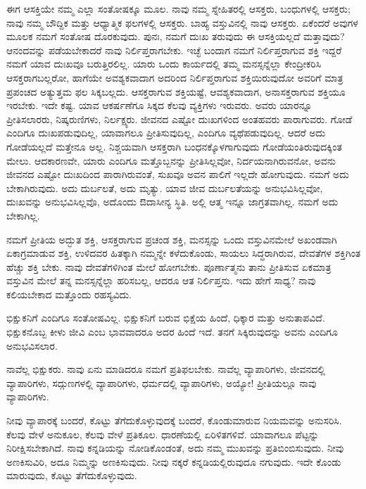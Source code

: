 ಈಗ ಆಸಕ್ತಿಯೇ ನಮ್ಮ ಎಲ್ಲಾ ಸಂತೋಷಕ್ಕೂ ಮೂಲ. ನಾವು ನಮ್ಮ ಸ್ನೇಹಿತರಲ್ಲಿ ಆಸಕ್ತರು, ಬಂಧುಗಳಲ್ಲಿ ಆಸಕ್ತರು; ನಾವು ನಮ್ಮ ಬೌದ್ದಿಕ ಮತ್ತು ಆಧ್ಯಾತ್ಮಿಕ ಫಲಗಳಲ್ಲಿ ಆಸಕ್ತರು. ಬಾಹ್ಯ ವಸ್ತುವಿನಲ್ಲಿ ನಾವು ಆಸಕ್ತರು. ಏಕೆಂದರೆ ಅವುಗಳ ಮೂಲಕ ನಮಗೆ ಸಂತೋಷ ದೊರಕುವುದು. ಪುನಃ, ನಮಗೆ ದುಃಖ ತರುವುದು ಈ ಆಸಕ್ತಿಯಲ್ಲದೆ ಮತ್ತಾವುದು? ಆನಂದವನ್ನು ಪಡೆಯಬೇಕಾದರೆ ನಾವು ನಿರ್ಲಿಪ್ತರಾಗಬೇಕು. ಇಚ್ಛೆ ಬಂದಾಗ ನಮಗೆ ನಿರ್ಲಿಪ್ತರಾಗುವ ಶಕ್ತಿ ಇದ್ದರೆ ನಮಗೆ ಯಾವ ದುಃಖವೂ ಬರುತ್ತಿರಲಿಲ್ಲ. ಯಾರು ಒಂದು ಕಾರ್ಯದಲ್ಲಿ ತಮ್ಮ ಮನಸ್ಸನ್ನೆಲ್ಲಾ ಕೇಂದ್ರೀಕರಿಸಿ ಆಸಕ್ತರಾಗಬಲ್ಲರೋ, ಹಾಗೆಯೇ ಅವಶ್ಯಕವಾದಾಗ ಅದರಿಂದ ನಿರ್ಲಿಪ್ತರಾಗುವ ಶಕ್ತಿಯಿರುವುದೋ ಅವರಿಗೆ ಮಾತ್ರ ಪ್ರಪಂಚದ ಅತ್ಯುತ್ತಮ ಫಲ ಸಿಕ್ಕಬಲ್ಲದು. ಆಸಕ್ತರಾಗುವ ಶಕ್ತಿಯಷ್ಟೆ, ಆವಶ್ಯಕವಾದಾಗ, ಅನಾಸಕ್ತರಾಗುವ ಶಕ್ತಿಯೂ ಇರಬೇಕು. ಇದೇ ಕಷ್ಟ. ಯಾವ ಆಕರ್ಷಣೆಗೂ ಸಿಕ್ಕದ ಕೆಲವು ವ್ಯಕ್ತಿಗಳು ಇರುವರು. ಅವರು ಯಾರನ್ನೂ ಪ್ರೀತಿಸಲಾರರು, ನಿಷ್ಕರುಣಿಗಳು, ನಿರ್ಲಕ್ಷ್ಯರು. ಜೀವನದ ಎಷ್ಟೋ ದುಃಖಗಳಿಂದ ಅಂತಹವರು ಪಾರಾಗುವರು. ಗೋಡೆ ಎಂದಿಗೂ ದುಃಖಪಡುವುದಿಲ್ಲ, ಯಾವಾಗಲೂ ಪ್ರೀತಿಸುವುದಿಲ್ಲ, ಎಂದಿಗೂ ವ್ಯಥೆಪಡುವುದಿಲ್ಲ. ಆದರೆ ಅದು ಗೋಡೆಯಲ್ಲದೆ ಮತ್ತೇನೂ ಅಲ್ಲ. ನಿಶ್ಚಯವಾಗಿ ಆಸಕ್ತರಾಗಿ ಬಂಧನಕ್ಕೊಳಗಾಗುವುದು ಗೋಡೆಯಂತಿರುವುದಕ್ಕಿಂತ ಮೇಲು. ಆದಕಾರಣವೇ, ಯಾರು ಎಂದಿಗೂ ಮತ್ತೊಬ್ಬನನ್ನು ಪ್ರೀತಿಸಿಲ್ಲವೋ, ನಿರ್ದಯನಾಗಿರುವನೋ, ಅವನು ಜೀವನದ ಎಷ್ಟೋ ದುಃಖದಿಂದ ಪಾರಾಗಿರುವಂತೆ, ಸುಖವೂ ಅವನ ಪಾಲಿಗೆ ಇಲ್ಲದೇ ಹೋಗುವುದು. ನಮಗೆ ಅದು ಬೇಕಾಗಿರುವುದು. ಅದು ದುರ್ಬಲತೆ, ಅದು ಮೃತ್ಯು. ಯಾವ ಜೀವ ದುರ್ಬಲತೆಯನ್ನು ಅನುಭವಿಸಿಲ್ಲವೋ, ದುಃಖವನ್ನು ಅನುಭವಿಸಿಲ್ಲವೊ, ಅದೊಂದು ಔದಾಸೀನ್ಯ ಸ್ಥಿತಿ. ಅಲ್ಲಿ ಆತ್ಮ ಇನ್ನೂ ಜಾಗ್ರತವಾಗಿಲ್ಲ. ನಮಗೆ ಅದು ಬೇಕಾಗಿಲ್ಲ.

ನಮಗೆ ಪ್ರೀತಿಯ ಅದ್ಭುತ ಶಕ್ತಿ, ಆಸಕ್ತರಾಗುವ ಪ್ರಚಂಡ ಶಕ್ತಿ, ಮನಸ್ಸನ್ನು ಒಂದು ವಸ್ತುವಿನಮೇಲೆ ಅಖಂಡವಾಗಿ ಏಕಾಗ್ರಮಾಡುವ ಶಕ್ತಿ, ಉಳಿದವರ ಹಿತಕ್ಕಾಗಿ ನಮ್ಮನ್ನೇ ಕಳೆದುಕೊಂಡು, ಸಾಯಲು ಸಿದ್ಧರಾಗಿರುವ, ದೇವತೆಗಳ ಶಕ್ತಿಗಿಂತ ಹೆಚ್ಚು ಶಕ್ತಿ ಬೇಕು. ನಾವು ದೇವತೆಗಳಿಗಿಂತ ಮೇಲೆ ಹೋಗಬೇಕು. ಪೂರ್ಣಾತ್ಮನು ತಾನು ಪ್ರೀತಿಸುವ ಏಕಮಾತ್ರ ವಸ್ತುವಿನ ಮೇಲೆ ತನ್ನ ಮನಸ್ಸನ್ನೆಲ್ಲಾ ಹರಿಸಬಲ್ಲ, ಆದರೂ ಆತ ನಿರ್ಲಿಪ್ತನು. ಇದು ಹೇಗೆ ಸಾಧ್ಯ? ನಾವು ಕಲಿಯಬೇಕಾದ ಮತ್ತೊಂದು ರಹಸ್ಯವಿದು.

ಭಿಕ್ಷುಕನಿಗೆ ಎಂದಿಗೂ ಸಂತೋಷವಿಲ್ಲ. ಭಿಕ್ಷುಕನಿಗೆ ಬರುವ ಭಿಕ್ಷೆಯ ಹಿಂದೆ, ಧಿಕ್ಕಾರ ಮತ್ತು ಅನುತಾಪವಿದೆ. ಭಿಕ್ಷುಕನೊಬ್ಬ ಕೀಳು ಜೀವಿ ಎಂಬ ಭಾವವಾದರೂ ಅದರ ಹಿಂದೆ ಇದೆ. ತನಗೆ ಸಿಕ್ಕಿರುವುದನ್ನು ಅವನು ಎಂದಿಗೂ ಅನುಭವಿಸಲಾರ.

ನಾವೆಲ್ಲ ಭಿಕ್ಷುಕರು. ನಾವು ಏನು ಮಾಡಿದರೂ ನಮಗೆ ಪ್ರತಿಫಲಬೇಕು. ನಾವೆಲ್ಲ ವ್ಯಾಪಾರಿಗಳು, ಜೀವನದಲ್ಲಿ ವ್ಯಾಪಾರಿಗಳು, ಸದ್ಗುಣಗಳಲ್ಲಿ ವ್ಯಾಪಾರಿಗಳು, ಧರ್ಮದಲ್ಲಿ ವ್ಯಾಪಾರಿಗಳು, ಅಯ್ಯೋ! ಪ್ರೀತಿಯಲ್ಲೂ ನಾವು ವ್ಯಾಪಾರಿಗಳು.

ನೀವು ವ್ಯಾಪಾರಕ್ಕೆ ಬಂದರೆ, ಕೊಟ್ಟು ತೆಗೆದುಕೊಳ್ಳುವುದಕ್ಕೆ ಬಂದರೆ, ಕೊಂಡುಮಾರುವ ನಿಯಮವನ್ನು ಅನುಸರಿಸಿ. ಕೆಲವು ವೇಳೆ ಅನುಕೂಲ, ಕೆಲವು ವೇಳೆ ಪ್ರತಿಕೂಲ. ಧಾರಣೆಯಲ್ಲಿ ಏರಿಳಿತಗಳಿವೆ. ಯಾವಾಗಲೂ ಪೆಟ್ಟನ್ನು ನಿರೀಕ್ಷಿಸಬೇಕಾಗಿದೆ. ನಾವು ಕನ್ನಡಿಯನ್ನು ನೋಡಿಕೊಂಡಂತೆ, ಅದು ನಮ್ಮ ಮುಖವನ್ನು ಪ್ರತಿಬಿಂಬಿಸುವುದು. ನೀವು ಅಣಕಿಸುವಿರಿ, ಅದೂ ನಿಮ್ಮನ್ನು ಅಣಕಿಸುವುದು. ನೀವು ನಕ್ಕರೆ ಕನ್ನಡಿಯಲ್ಲಿರುವುದೂ ನಗುವುದು. ಇದೇ ಕೊಂಡು ಮಾರುವುದು, ಕೊಟ್ಟು ತೆಗೆದುಕೊಳ್ಳುವುದು.

